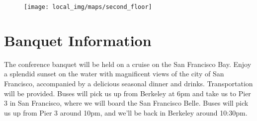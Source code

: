 \begin{figure}[h!]
\center
\texttt{[image: local\_img/maps/second\_floor]}
\end{figure}


 \section{Banquet Information}
The conference banquet will be held on a cruise on the San Francisco Bay. Enjoy a splendid sunset on the water with magnificent views of the city of San Francisco, accompanied by a
delicious seasonal dinner and drinks. Transportation will be provided. Buses will pick us up from Berkeley at 6pm and take us to Pier 3 in San Francisco, where we will board the San Francisco Belle. Buses will pick us up from Pier 3 around 10pm, and we'll be back in Berkeley
around 10:30pm.







\setlength\fboxrule{0pt}

